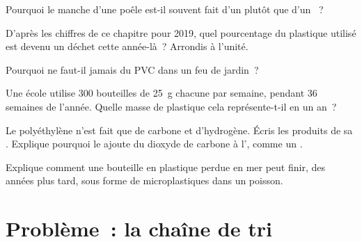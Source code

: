 \begin{exercise}[$\star\star$]\label{exo:g8:plastics:7}
Pourquoi le manche d'une poêle est-il souvent fait d'un 
plutôt que d'un ~?
\end{exercise}

\begin{exercise}[$\star\star$]\label{exo:g8:plastics:8}
D'après les chiffres de ce chapitre pour 2019, quel pourcentage du
plastique utilisé est devenu un déchet cette année-là~? Arrondis à
l'unité.
\end{exercise}

\begin{exercise}[$\star\star$]\label{exo:g8:plastics:9}
Pourquoi ne faut-il jamais  du PVC dans un feu de jardin~?
\end{exercise}

\begin{exercise}[$\star\star$]\label{exo:g8:plastics:10}
Une école utilise 300 bouteilles de \qty{25}{g} chacune par semaine,
pendant 36 semaines de l'année. Quelle masse de plastique cela
représente-t-il en un an~?
\end{exercise}

\begin{exercise}[$\star\star\star$]\label{exo:g8:plastics:11}
Le polyéthylène n'est fait que de carbone et d'hydrogène. Écris les
produits de sa . Explique pourquoi le  ajoute du
dioxyde de carbone à l', comme un .
\end{exercise}

\begin{exercise}[$\star\star\star$]\label{exo:g8:plastics:12}
Explique comment une bouteille en plastique perdue en mer peut finir,
des années plus tard, sous forme de microplastiques dans un poisson.
\end{exercise}

\section{Problème~: la chaîne de tri}

